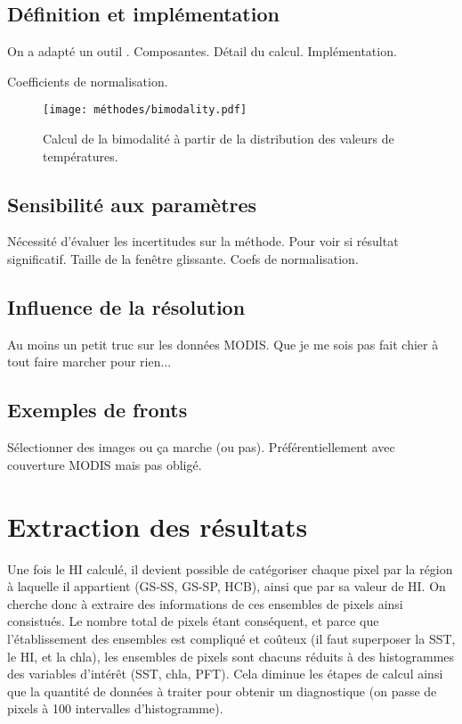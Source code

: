 \documentclass[index]{subfiles}
\begin{document}
\subsection{Définition et implémentation}
\label{sec:HI-definition}

On a adapté un outil \parencite{liu_2016}.
Composantes.
Détail du calcul.
Implémentation.

Coefficients de normalisation.

\begin{figure}
  \centering
  \texttt{[image: méthodes/bimodality.pdf]}
  \caption[Calcul de la bimodalité]{Calcul de la bimodalité à partir de la distribution des valeurs de températures.}
  \label{fig:bimodality}
\end{figure}

\subsection{Sensibilité aux paramètres}
\label{sec:HI-sensibilite}

Nécessité d'évaluer les incertitudes sur la méthode.
Pour voir si résultat significatif.
Taille de la fenêtre glissante. Coefs de normalisation.

\subsection{Influence de la résolution}
\label{sec:HI-influence-resolution}

Au moins un petit truc sur les données MODIS.
Que je me sois pas fait chier à tout faire marcher pour rien...

\subsection{Exemples de fronts}
\label{sec:HI-exemples}

Sélectionner des images ou ça marche (ou pas).
Préférentiellement avec couverture MODIS mais pas obligé.

\section{Extraction des résultats}
\label{sec:extraction-res}

Une fois le HI calculé, il devient possible de catégoriser chaque pixel par la région à laquelle il appartient (GS-SS, GS-SP, HCB), ainsi que par sa valeur de HI.
On cherche donc à extraire des informations de ces ensembles de pixels ainsi consistués.
Le nombre total de pixels étant conséquent, et parce que l'établissement des ensembles est compliqué et coûteux (il faut superposer la SST, le HI, et la \gls{chla}), les ensembles de pixels sont chacuns réduits à des histogrammes des variables d'intérêt (SST, \gls{chla}, PFT).
Cela diminue les étapes de calcul ainsi que la quantité de données à traiter pour obtenir un diagnostique (on passe de  pixels à \num{100} intervalles d'histogramme).
\end{document}

